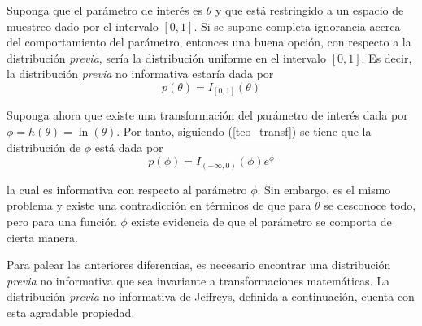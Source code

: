 \begin{Eje}
Suponga que el parámetro de interés es $\theta$ y que está restringido a un espacio de muestreo dado por el intervalo $[0,1]$. Si se supone completa ignorancia acerca del comportamiento del parámetro, entonces una buena opción, con respecto a la distribución \emph{previa}, sería la distribución uniforme en el intervalo $[0,1]$. Es decir, la distribución \emph{previa} no informativa estaría dada por
\begin{equation*}
p(\theta) = I_{[0,1]}(\theta)
\end{equation*}

Suponga ahora que existe una transformación del parámetro de interés dada por $\phi=h(\theta)=\ln(\theta)$. Por tanto, siguiendo (\ref{teo_transf}) se tiene que la distribución de $\phi$ está dada por
\begin{equation*}
p(\phi)=I_{(-\infty,0)}(\phi)e^{\phi}
\end{equation*}

la cual es informativa con respecto al parámetro $\phi$. Sin embargo, es el mismo problema y existe una contradicción en términos de que para $\theta$ se desconoce todo, pero para una función $\phi$ existe evidencia de que el parámetro se comporta de cierta manera.
\end{Eje}

Para palear las anteriores diferencias, es necesario encontrar una distribución \emph{previa} no informativa que sea invariante a transformaciones matemáticas. La distribución \emph{previa} no informativa de Jeffreys, definida a continuación, cuenta con esta agradable propiedad.

